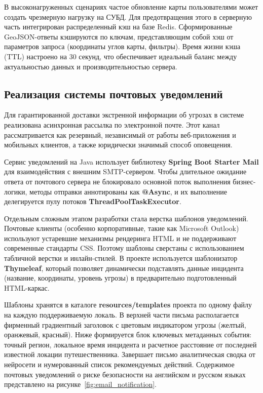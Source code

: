 В высоконагруженных сценариях частое обновление карты пользователями может создать чрезмерную нагрузку на СУБД. Для предотвращения этого в серверную часть интегрирован распределенный кэш на базе Redis. Сформированные GeoJSON-ответы кэшируются по ключам, представляющим собой хэш от параметров запроса (координаты углов карты, фильтры). Время жизни кэша (TTL) настроено на 30 секунд, что обеспечивает идеальный баланс между актуальностью данных и производительностью сервера.

\subsection{Реализация системы почтовых уведомлений}

Для гарантированной доставки экстренной информации об угрозах в системе реализована асинхронная рассылка по электронной почте. Этот канал рассматривается как резервный, независимый от работы веб-приложения и мобильных клиентов, а также юридически значимый способ оповещения.

Сервис уведомлений на Java использует библиотеку \textbf{Spring Boot Starter Mail} для взаимодействия с внешним SMTP-сервером. Чтобы длительное ожидание ответа от почтового сервера не блокировало основной поток выполнения бизнес-логики, методы отправки аннотированы как \textbf{@Async}, и их выполнение делегируется пулу потоков \textbf{ThreadPoolTaskExecutor}.

Отдельным сложным этапом разработки стала верстка шаблонов уведомлений. Почтовые клиенты (особенно корпоративные, такие как Microsoft Outlook) используют устаревшие механизмы рендеринга HTML и не поддерживают современные стандарты CSS. Поэтому шаблоны сверстаны с использованием табличной верстки и инлайн-стилей. В проекте используется шаблонизатор \textbf{Thymeleaf}, который позволяет динамически подставлять данные инцидента (название, координаты, уровень угрозы) в предварительно подготовленный HTML-каркас. 

Шаблоны хранятся в каталоге \textbf{resources/templates} проекта по одному файлу на каждую поддерживаемую локаль. В верхней части письма располагается фирменный градиентный заголовок с цветовым индикатором угрозы (желтый, оранжевый, красный). Ниже формируется блок ключевых метаданных события: точный регион, локальное время инцидента и расчетное расстояние от последней известной локации путешественника. Завершает письмо аналитическая сводка от нейросети и нумерованный список рекомендуемых действий. Содержимое почтовых уведомлений о риске безопасности на английском и русском языках представлено на рисунке~\ref{fig:email_notification}.

